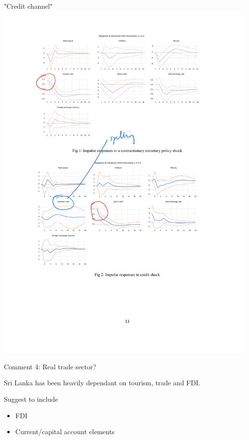 \documentclass[10pt,english,slidetop,compress,
              blue,mathserif,color=option]{beamer}
\theoremstyle{plain}
\theoremstyle{definition}
\begin{document}
\begin{frame}{"Credit channel"}
  \includegraphics[width=0.99\textwidth]{figures/CR-shock.pdf}
\end{frame}

\begin{frame}{Comment 4: Real trade sector?}
  
  Sri Lanka has been heavily dependant on tourism, trade and FDI. 
  \bigskip

  Suggest to include
  \begin{itemize}
    \item FDI
    \item Current/capital account elements
  \end{itemize}

\end{frame}
\end{document}
